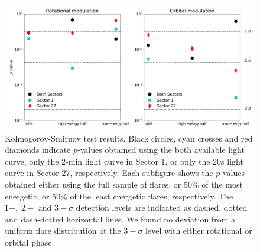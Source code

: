\documentclass[fleqn,usenatbib,letters]{mnras}%
\begin{document}
\begin{figure}
\includegraphics[width=\hsize]{figures/2021_06_09_AUMic_KStests_meta.png} 
\caption{Kolmogorov-Smirnov test results. Black circles, cyan crosses and red diamonds indicate $p$-values obtained using the both available light curve, only the 2-min light curve in Sector 1, or only the 20s light curve in Sector 27, respectively. Each subfigure shows the $p$-values obtained either using the full sample of flares, or 50\% of the most energetic, or 50\% of the least energetic flares, respectively. The $1-,\;2-$ and $3-\sigma$ detection levels are indicated as dashed, dotted and dash-dotted horizontal lines. We found no deviation from a uniform flare distribution at the $3-\sigma$ level with either rotational or orbital phase.}
\label{fig:kstests}
\end{figure}
\end{document}

